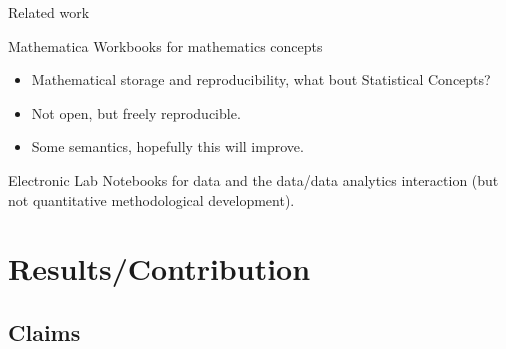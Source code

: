 \documentclass{beamer}
\begin{document}



\begin{frame}{Related work}

  Mathematica Workbooks for mathematics concepts
  \begin{itemize}
  \item Mathematical storage and reproducibility, what bout Statistical
    Concepts?
  \item Not open, but freely reproducible.
  \item Some semantics, hopefully this will improve.
  \end{itemize}

  Electronic Lab Notebooks for data and the data/data analytics
  interaction (but not quantitative methodological development).
\end{frame}

\section{Results/Contribution}

\subsection{Claims}

\end{document}
